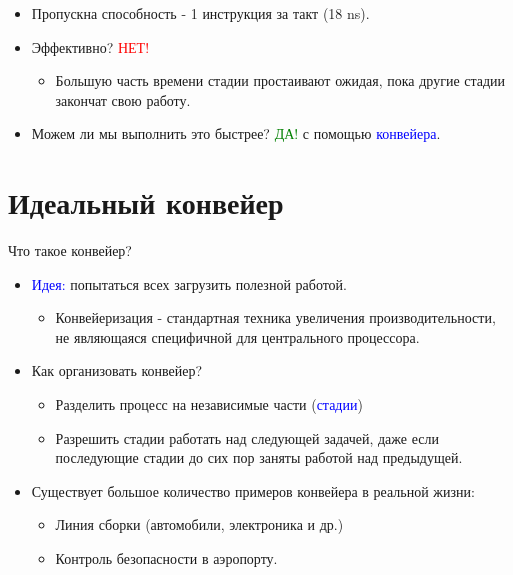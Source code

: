 \begin{frame}
\vfill
\centering
{}
\pause\vfill
\begin{itemize}
    \item Пропускна способность - 1 инструкция за такт (18 ns).\pause
    \item Эффективно? \pause\textcolor{red}{НЕТ!}
    \begin{itemize}
        \item Большую часть времени стадии простаивают ожидая, пока другие стадии закончат свою работу.\pause
    \end{itemize}
    \item Можем ли мы выполнить это быстрее? \pause\textcolor{green}{ДА!} с помощью \textcolor{blue}{конвейера}.
\end{itemize}
\end{frame}

\section{Идеальный конвейер}

\begin{frame}{Что такое конвейер?}
\begin{itemize}
    \item \textcolor{blue}{Идея:} попытаться всех загрузить полезной работой.
    \begin{itemize}
        \item Конвейеризация - стандартная техника увеличения производительности, не являющаяся специфичной для центрального процессора.\pause
    \end{itemize}
    \item Как организовать конвейер?\pause
    \begin{itemize}
        \item Разделить процесс на независимые части (\textcolor{blue}{стадии})\pause
        \item Разрешить стадии работать над следующей задачей, даже если последующие стадии до сих пор заняты работой над предыдущей.\pause
    \end{itemize}
    \item Существует большое количество примеров конвейера в реальной жизни:\pause
    \begin{itemize}
        \item Линия сборки (автомобили, электроника и др.)
        \item Контроль безопасности в аэропорту.
    \end{itemize}
\end{itemize}
\end{frame}

